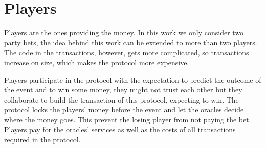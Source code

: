 \section{Players}

Players are the ones providing the money.
In this work we only consider two party bets, the idea behind this work can be
extended to more than two players.
The code in the transactions, however,  gets more complicated, so transactions
  increase on size, which makes the protocol more expensive.

Players participate in the protocol with the expectation to predict the
  outcome of the event and to win some money, they might not trust each other but
  they collaborate to build the transaction of this protocol, expecting to win.
The protocol locks the players' money before the event and let the oracles
  decide where the money goes.
This prevent the losing player from not paying the bet.
Players pay for the oracles' services as well as the costs of all transactions
  required in the protocol.
